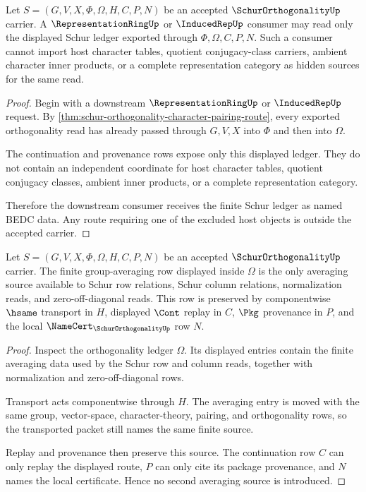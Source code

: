 \begin{theorem}
\label{thm:schurorthogonality-representation-ring-route}
Let $S=(G,V,X,\Phi,\Omega,H,C,P,N)$ be an accepted $\SchurOrthogonalityUp$ carrier. A $\RepresentationRingUp$ or $\InducedRepUp$ consumer may read only the displayed Schur ledger exported through $\Phi,\Omega,C,P,N$. Such a consumer cannot import host character tables, quotient conjugacy-class carriers, ambient character inner products, or a complete representation category as hidden sources for the same read.
\end{theorem}
\begin{proof}
Begin with a downstream $\RepresentationRingUp$ or $\InducedRepUp$ request. By \autoref{thm:schur-orthogonality-character-pairing-route}, every exported orthogonality read has already passed through $G,V,X$ into $\Phi$ and then into $\Omega$.

The continuation and provenance rows expose only this displayed ledger. They do not contain an independent coordinate for host character tables, quotient conjugacy classes, ambient inner products, or a complete representation category.

Therefore the downstream consumer receives the finite Schur ledger as named BEDC data. Any route requiring one of the excluded host objects is outside the accepted carrier.
\end{proof}

\begin{theorem}
\label{thm:schurorthogonality-group-averaging-ledger}
Let $S=(G,V,X,\Phi,\Omega,H,C,P,N)$ be an accepted $\SchurOrthogonalityUp$ carrier. The finite group-averaging row displayed inside $\Omega$ is the only averaging source available to Schur row relations, Schur column relations, normalization reads, and zero-off-diagonal reads. This row is preserved by componentwise $\hsame$ transport in $H$, displayed $\Cont$ replay in $C$, $\Pkg$ provenance in $P$, and the local $\NameCert_{\SchurOrthogonalityUp}$ row $N$.
\end{theorem}
\begin{proof}
Inspect the orthogonality ledger $\Omega$. Its displayed entries contain the finite averaging data used by the Schur row and column reads, together with normalization and zero-off-diagonal rows.

Transport acts componentwise through $H$. The averaging entry is moved with the same group, vector-space, character-theory, pairing, and orthogonality rows, so the transported packet still names the same finite source.

Replay and provenance then preserve this source. The continuation row $C$ can only replay the displayed route, $P$ can only cite its package provenance, and $N$ names the local certificate. Hence no second averaging source is introduced.
\end{proof}

